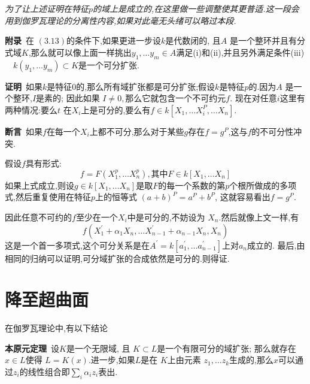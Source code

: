 \documentclass[UTF8]{book}
\begin{document}
		
	\section{}
		\textit{为了让上述证明在特征$ p $的域上是成立的,在这里做一些调整使其更普适.这一段会用到伽罗瓦理论的分离性内容,如果对此毫无头绪可以略过本段.}
		
		\textbf{附录}\ 在 $(3.13)$的条件下,如果更进一步设$k$是代数闭的, 且$A$ 是一个整环并且有分式域$K$,那么就可以像上面一样挑出$y_{1}, \ldots y_{m} \in A$满足(i)和(ii),并且另外满足条件(iii) $\quad k \left(y _{1}, \dots y _{ m }\right) \subset K$是一个可分扩张.
		
		
		\textbf{证明}\ 如果$k$是特征$0$的,那么所有域扩张都是可分扩张;假设$k$是特征$ p $的.因为$A$ 是一个整环,$ I $是素的; 因此如果 $I \neq 0,$那么它就包含一个不可约元$ f $. 现在对任意$ i $这里有两种情况:要么$t$ 在$X _{ i }$上是可分的,要么有$f \in k \left[ X _{1}, \ldots X _{ i }^{ P }, \ldots X _{ n }\right]$.
		
		
		\textbf{断言}\ 如果$ f $在每一个$ X_{i} $上都不可分,那么对于某些$ g $存在$ f = g^{P} $,这与$ f $的不可分性冲突.
		
		假设$f$具有形式:
		\begin{equation*}
		f = F \left(X _{1}^{ p }, \ldots X _{ n }^{ p }\right), \text {其中} F \in k \left[ X _{1}, \ldots X _{ n }\right]
		\end{equation*}
		如果上式成立,则设$g \in k \left[ X _{1}, \ldots X _{ n }\right]$是取$ F $的每一个系数的第$ p $个根所做成的多项式,然后重复使用在特征$ p $上的恒等式 $(a+b)^{P}=a ^{P}+b^{P}$, 这就容易看出$ f = g^{P} $.
		
		因此任意不可约的$f$至少在一个$X_{i}$中是可分的,不妨设为 $X _{ n } .$然后就像上文一样,有
		\begin{equation*}
		f \left(X _{1}^{\prime}+\alpha_{1} X _{ n }, \ldots X _{ n -1}^{\prime}+\alpha_{ n -1} X _{ n }, X _{ n }\right)
		\end{equation*}
		这是一个首一多项式,这个可分关系是在$A ^{\prime}= k \left[ a _{1}^{\prime},\ldots a _{ n -1}^{\prime}\right]$上对$ a_{n} $成立的. 最后,由相同的归纳可以证明,可分域扩张的合成依然是可分的.则得证.
		
		
	\section{降至超曲面}
		在伽罗瓦理论中,有以下结论
		
		\textbf{本原元定理}\ 设$K$是一个无限域, 且 $K \subset L$是一个有限可分的域扩张; 那么就存在$x \in L$使得 $L=K(x) .$进一步,如果$ L $是在 $K$上由元素 $z_{1}, \ldots z_{k }  $生成的,那么$x$可以通过$ z_{i} $的线性组合即$\sum_{i} \alpha_{i} z_{i}$表出.
		
\end{document}
